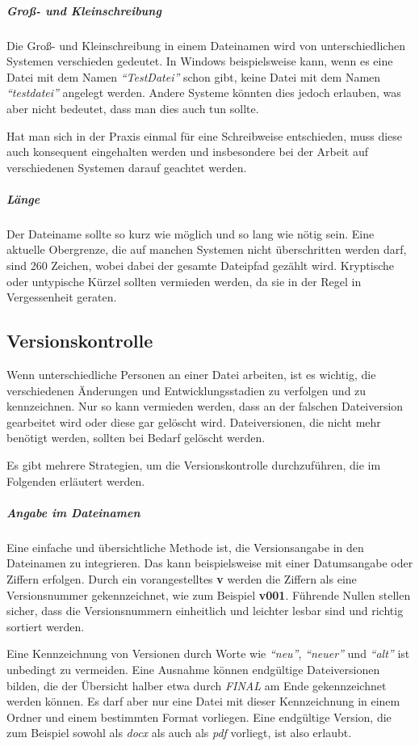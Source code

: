 \subparagraph{Groß- und Kleinschreibung} Die Groß- und Kleinschreibung in einem Dateinamen wird von unterschiedlichen Systemen verschieden gedeutet. In Windows beispielsweise kann, wenn es eine Datei mit dem Namen \emph{"`TestDatei"'} schon gibt, keine Datei mit dem Namen \emph{"`testdatei"'} angelegt werden. Andere Systeme könnten dies jedoch erlauben, was aber nicht bedeutet, dass man dies auch tun sollte.

Hat man sich in der Praxis einmal für eine Schreibweise entschieden, muss diese auch konsequent eingehalten werden und insbesondere bei der Arbeit auf verschiedenen Systemen darauf geachtet werden.

\subparagraph{Länge} Der Dateiname sollte so kurz wie möglich und so lang wie nötig sein. Eine aktuelle Obergrenze, die auf manchen Systemen nicht überschritten werden darf, sind 260 Zeichen, wobei dabei der gesamte Dateipfad gezählt wird. Kryptische oder untypische Kürzel sollten vermieden werden, da sie in der Regel in Vergessenheit geraten.

\subsection{Versionskontrolle}\label{versionskontrolle}
Wenn unterschiedliche Personen an einer Datei arbeiten, ist es wichtig, die verschiedenen Änderungen und Entwicklungsstadien zu verfolgen und zu kennzeichnen. Nur so kann vermieden werden, dass an der falschen Dateiversion gearbeitet wird oder diese gar gelöscht wird. Dateiversionen, die nicht mehr benötigt werden, sollten bei Bedarf gelöscht werden.

Es gibt mehrere Strategien, um die Versionskontrolle durchzuführen, die im Folgenden erläutert werden.

\subparagraph{Angabe im Dateinamen} Eine einfache und übersichtliche Methode ist, die Versionsangabe in den Dateinamen zu integrieren. Das kann beispielsweise mit einer Datumsangabe oder Ziffern erfolgen. Durch ein vorangestelltes {\bfseries v} werden die Ziffern als eine Versionsnummer gekennzeichnet, wie zum Beispiel {\bfseries v001}. Führende Nullen stellen sicher, dass die Versionsnummern einheitlich und leichter lesbar sind und richtig sortiert werden.

Eine Kennzeichnung von Versionen durch Worte wie \emph{"`neu"'}, \emph{"`neuer"'} und \emph{"`alt"'} ist unbedingt zu vermeiden. Eine Ausnahme können endgültige Dateiversionen bilden, die der Übersicht halber etwa durch \emph{FINAL} am Ende gekennzeichnet werden können. Es darf aber nur eine Datei mit dieser Kennzeichnung in einem Ordner und einem bestimmten Format vorliegen. Eine endgültige Version, die zum Beispiel sowohl als \emph{docx} als auch als \emph{pdf} vorliegt, ist also erlaubt.

